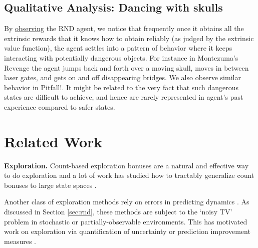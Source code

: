 \documentclass{article} %
\begin{document}
\subsection{Qualitative Analysis: Dancing with skulls}
By \href{https://github.com/openai/random-network-distillation}{observing} the RND agent, we notice that frequently once it obtains all the extrinsic rewards that it knows how to obtain reliably (as judged by the extrinsic value function), the agent settles into a pattern of behavior where it keeps interacting with potentially dangerous objects. For instance in Montezuma's Revenge the agent jumps back and forth over a moving skull, moves in between laser gates, and gets on and off disappearing bridges. We also observe similar behavior in Pitfall!. It might be related to the very fact that such dangerous states are difficult to achieve, and hence are rarely represented in agent's past experience compared to safer states.

\section{Related Work}
\textbf{Exploration.} Count-based exploration bonuses are a natural and effective way to do exploration \citep{strehl2008analysis} and a lot of work has studied how to tractably generalize count bonuses to large state spaces \citep{bellemare2016unifying,fu2017ex2,pixelcnncount,tang2016exploration,machado2018count,fox2018dora}.

Another class of exploration methods rely on errors in predicting dynamics \citep{schmidhuber_curiosity,stadie2015incentivizing,josh_surprise,pathakICMl17curiosity,burda18largescale}. As discussed in Section \ref{sec:rnd}, these methods are subject to the `noisy TV' problem in stochastic or partially-observable environments. This has motivated work on exploration via quantification of uncertainty \citep{still2012information,houthooft2016vime} or prediction improvement measures \citep{schmidhuber1991curious,oudeyer2007intrinsic,lopes2012exploration,josh_surprise}.
\end{document}
